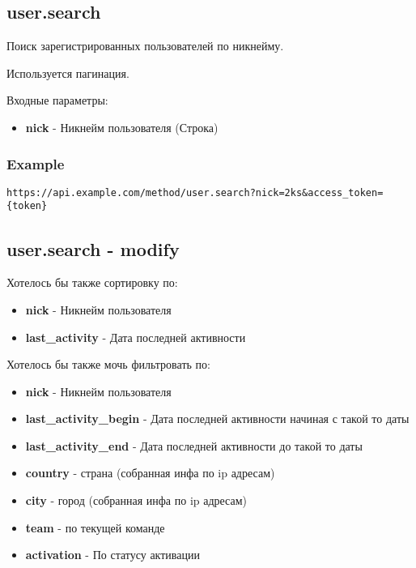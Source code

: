 \subsection{user.search}
Поиск зарегистрированных пользователей по никнейму.

Используется пагинация.

Входные параметры:
\begin{itemize}
  \item \textbf{nick} - Никнейм пользователя (Строка)
\end{itemize}

\subsubsection{Example}
\begin{Verbatim}[frame=single]
https://api.example.com/method/user.search?nick=2ks&access_token={token}
\end{Verbatim}

\subsection{user.search - modify}

\par
Хотелось бы также сортировку по:
\begin{itemize}
  \item \textbf{nick} - Никнейм пользователя
  \item \textbf{last\_activity} - Дата последней активности
\end{itemize}

\par
Хотелось бы также мочь фильтровать по:
\begin{itemize}
  \item \textbf{nick} - Никнейм пользователя
  \item \textbf{last\_activity\_begin} - Дата последней активности начиная с такой то даты
  \item \textbf{last\_activity\_end} - Дата последней активности до такой то даты
  \item \textbf{country} - страна (собранная инфа по ip адресам)
  \item \textbf{city} - город (собранная инфа по ip адресам)
  \item \textbf{team} - по текущей команде
  \item \textbf{activation} - По статусу активации
\end{itemize}

